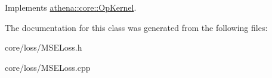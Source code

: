 Implements \mbox{\hyperlink{classathena_1_1core_1_1_op_kernel_a762e541463ffd089b47a8e6755c30fe1}{athena\+::core\+::\+Op\+Kernel}}.



The documentation for this class was generated from the following files\+:\begin{DoxyCompactItemize}
\item 
core/loss/M\+S\+E\+Loss.\+h\item 
core/loss/M\+S\+E\+Loss.\+cpp\end{DoxyCompactItemize}
